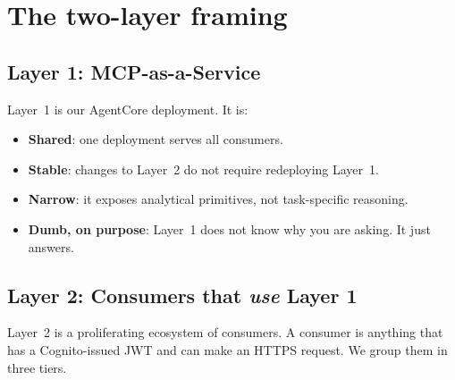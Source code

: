 \documentclass[11pt,letterpaper]{article}
\begin{document}
\section{The two-layer framing}

\subsection{Layer 1: MCP-as-a-Service}

Layer~1 is our AgentCore deployment. It is:

\begin{itemize}[leftmargin=*, itemsep=2pt]
  \item \textbf{Shared}: one deployment serves all consumers.
  \item \textbf{Stable}: changes to Layer~2 do not require redeploying
        Layer~1.
  \item \textbf{Narrow}: it exposes analytical primitives, not
        task-specific reasoning.
  \item \textbf{Dumb, on purpose}: Layer~1 does not know why you are
        asking. It just answers.
\end{itemize}

\subsection{Layer 2: Consumers that \emph{use} Layer 1}

Layer~2 is a proliferating ecosystem of consumers. A consumer is anything
that has a Cognito-issued JWT and can make an HTTPS request. We group
them in three tiers.
\end{document}
